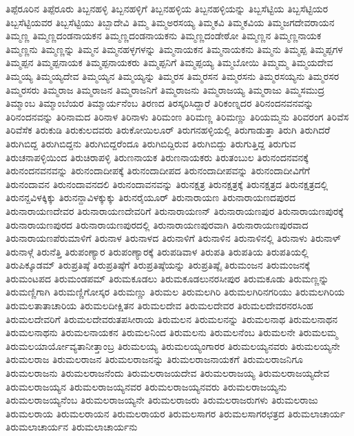 {ತಿಪ್ಪೆರೂರಿನ
ತಿಪ್ಪೆರೂರು
ತಿಬ್ಬನಹಳ್ಳಿ
ತಿಬ್ಬನಹಳ್ಳಿಗೆ
ತಿಬ್ಬನಹಳ್ಳಿಯ
ತಿಬ್ಬನಹಳ್ಳಿಯನ್ನು
ತಿಬ್ಬಸೆಟ್ಟಿಯ
ತಿಬ್ಬಸೆಟ್ಟಿಯರ
ತಿಬ್ಬಸೆಟ್ಟಿಯವರ
ತಿಬ್ಬಸೆಟ್ಟಿಯು
ತಿಬ್ಬಾದೇವಿ
ತಿಮ್ಮ
ತಿಮ್ಮಅರಸಯ್ಯ
ತಿಮ್ಮಕವಿ
ತಿಮ್ಮಕವಿಯ
ತಿಮ್ಮಜಗದೇವರಾಯನ
ತಿಮ್ಮಣ್ಣ
ತಿಮ್ಮಣ್ಣದಂಡನಾಯಕನ
ತಿಮ್ಮಣ್ಣದಂಡನಾಯಕನು
ತಿಮ್ಮಣ್ಣದಂಡೇಠೋ
ತಿಮ್ಮಣ್ಣನ
ತಿಮ್ಮಣ್ಣನಾಯಕ
ತಿಮ್ಮಣ್ಣನು
ತಿಮ್ಮಣ್ಣನ್ನು
ತಿಮ್ಮನ
ತಿಮ್ಮನಹಳ್ಳಗಳನ್ನು
ತಿಮ್ಮನಾಯಕನ
ತಿಮ್ಮನಾಯಕನು
ತಿಮ್ಮನು
ತಿಮ್ಮಪ್ಪ
ತಿಮ್ಮಪ್ಪಗಳ
ತಿಮ್ಮಪ್ಪನ
ತಿಮ್ಮಪ್ಪನಾಯಕ
ತಿಮ್ಮಪ್ಪನಾಯಕರು
ತಿಮ್ಮಪ್ಪನಿಗೆ
ತಿಮ್ಮಪ್ಪಯ್ಯ
ತಿಮ್ಮಬೋಯಿ
ತಿಮ್ಮಮ್ಮ
ತಿಮ್ಮಯದೇವ
ತಿಮ್ಮಯ್ಯ
ತಿಮ್ಮಯ್ಯದೇವ
ತಿಮ್ಮಯ್ಯನ
ತಿಮ್ಮಯ್ಯನ್ನು
ತಿಮ್ಮರಸ
ತಿಮ್ಮರಸನ
ತಿಮ್ಮರಸನು
ತಿಮ್ಮರಸಯ್ಯನು
ತಿಮ್ಮರಸರ
ತಿಮ್ಮರಸರು
ತಿಮ್ಮರಾಜ
ತಿಮ್ಮರಾಜನ
ತಿಮ್ಮರಾಜನಿಗೆ
ತಿಮ್ಮರಾಜನು
ತಿಮ್ಮರಾಜಯ್ಯ
ತಿಮ್ಮರಾಜು
ತಿಮ್ಮಸಮುದ್ರ
ತಿಮ್ಮಾಂಬ
ತಿಮ್ಮಾಂಬೆಯರ
ತಿಮ್ಮಾರ್ಯನೆಂಬ
ತಿರಣದ
ತಿರಸ್ಕರಿಸಿದ್ದಾರೆ
ತಿರಿಕಂಣ್ನದರ
ತಿರಿನಂದನವನವನ್ನು
ತಿರಿನಂದನವನ್ನು
ತಿರಿನಾಮದ
ತಿರಿನಾಳ
ತಿರಿನಾಳು
ತಿರಿಮಂಣ
ತಿರಿಮಣ್ಣ
ತಿರಿಮಣ್ಣು
ತಿರಿಯಮ್ಮನು
ತಿರಿವರಂಗ
ತಿರಿವೆಸ
ತಿರಿವೆಸೆಕ
ತಿರುಕುಡಿ
ತಿರುಕುಲದವರು
ತಿರುಕೋಯಿಲೂರ್
ತಿರುಗನಹಳ್ಳಿಯಲ್ಲಿ
ತಿರುಗಾಡುತ್ತಾ
ತಿರುಗಿ
ತಿರುಗಿದರೆ
ತಿರುಗಿಬಿದ್ದ
ತಿರುಗಿಬಿದ್ದನು
ತಿರುಗಿಬಿದ್ದರೆಂದೂ
ತಿರುಗಿಬಿದ್ದಿರುವ
ತಿರುಗಿಬಿದ್ದು
ತಿರುಗುತ್ತಿದ್ದ
ತಿರುಗುವ
ತಿರುಚನಾಪಳ್ಳಿಯಿಂದ
ತಿರುಚಿರಾಪಳ್ಳಿ
ತಿರುಣನಾಯಕ
ತಿರುಣನಾಯಕರು
ತಿರುತಂಬುಲ
ತಿರುನಂದನವನಕ್ಕೆ
ತಿರುನಂದನವನವನ್ನು
ತಿರುನಂದಾದೀಪಕ್ಕೆ
ತಿರುನಂದಾದೀಪದ
ತಿರುನಂದಾದೀಪವನ್ನು
ತಿರುನಂದಾದೀವಿಗೆಗೆ
ತಿರುನಂದಾವನ
ತಿರುನಂದಾವನದಲಿ
ತಿರುನಂದಾವನವನ್ನು
ತಿರುನಕ್ಷತ್ರ
ತಿರುನಕ್ಷತ್ರಕ್ಕೆ
ತಿರುನಕ್ಷತ್ರದ
ತಿರುನಕ್ಷತ್ರದಲ್ಲಿ
ತಿರುನನ್ದವಿಳಕ್ಕಿಕ್ಕು
ತಿರುನನ್ದಾವಿಳಕ್ಕುಕ್ಕು
ತಿರುನರೈಯೂರ್
ತಿರುನಾರಾಯಣ
ತಿರುನಾರಾಯಣದಪುರದ
ತಿರುನಾರಾಯಣದೇವರ
ತಿರುನಾರಾಯಣದೇವರಿಗೆ
ತಿರುನಾರಾಯಣನ್
ತಿರುನಾರಾಯಣಪುರ
ತಿರುನಾರಾಯಣಪುರಕ್ಕೆ
ತಿರುನಾರಾಯಣಪುರದ
ತಿರುನಾರಾಯಣಪುರದಲ್ಲಿ
ತಿರುನಾರಾಯಣಪುರವಾಗಿ
ತಿರುನಾರಾಯಣಪುರವಾದ
ತಿರುನಾರಾಯಣಪೆರುಮಾಳಿಗೆ
ತಿರುನಾಳ
ತಿರುನಾಳದ
ತಿರುನಾಳಿಗೆ
ತಿರುನಾಳಿನ
ತಿರುನಾಳಿನಲ್ಲಿ
ತಿರುನಾಳು
ತಿರುನಾಳ್
ತಿರುನಾಳ್ಗೆ
ತಿರುನೆತ್ತಿ
ತಿರುಪಂಣ್ಯಾರ
ತಿರುಪಂಣ್ಯಾರಕ್ಕೆ
ತಿರುಪಡಿವಾಳ
ತಿರುಪತಿ
ತಿರುಪತಿಯ
ತಿರುಪತಿಯಲ್ಲಿ
ತಿರುಪಿಕ್ಕೂಡಮ್
ತಿರುಪ್ರತಿಷ್ಠೆ
ತಿರುಪ್ರತಿಷ್ಠೆಗೆ
ತಿರುಪ್ರತಿಷ್ಠೆಯನ್ನು
ತಿರುಪ್ರತಿಷ್ಠೈ
ತಿರುಮಂಜನ
ತಿರುಮಂಜನಕ್ಕೆ
ತಿರುಮಂಟಪದ
ತಿರುಮಂಡಪಮ್
ತಿರುಮಕೂಡಲು
ತಿರುಮಕೂಡಲುನರಸೀಪುರ
ತಿರುಮಕೂಡು
ತಿರುಮಣ್ಣನ್ನು
ತಿರುಮಣ್ಣಿಗಾಗಿ
ತಿರುಮಣ್ಣಿಗೋಸ್ಕರ
ತಿರುಮಣ್ಣು
ತಿರುಮಲ
ತಿರುಮಲಗಿರಿ
ತಿರುಮಲಗಿರಿನಗರಿಯು
ತಿರುಮಲಗಿರಿಯ
ತಿರುಮಲತಾತಾಚಾರಿಯ
ತಿರುಮಲದೀಕ್ಷಿತನ
ತಿರುಮಲದೇವ
ತಿರುಮಲದೇವರ
ತಿರುಮಲದೇವರನರಸಿಂಹ
ತಿರುಮಲದೇವರಿಗೆ
ತಿರುಮಲದೇವರುತಪಸೀರಾಯ
ತಿರುಮಲನ
ತಿರುಮಲನನ್ನು
ತಿರುಮಲನಾಥ
ತಿರುಮಲನಾಥನ
ತಿರುಮಲನಾಥನು
ತಿರುಮಲನಾಯಕನ
ತಿರುಮಲನಿಂದ
ತಿರುಮಲನು
ತಿರುಮಲನೆಂಬ
ತಿರುಮಲನೇ
ತಿರುಮಲಮ್ಮ
ತಿರುಮಲಯಾರ್ಯೋವ್ಯತಾನೀತ್ತಾಂಬ್ರ
ತಿರುಮಲಯ್ಯ
ತಿರುಮಲಯ್ಯಂಗಾರರ
ತಿರುಮಲಯ್ಯನವರು
ತಿರುಮಲಯ್ಯನೇ
ತಿರುಮಲರಾಜ
ತಿರುಮಲರಾಜನ
ತಿರುಮಲರಾಜನನ್ನು
ತಿರುಮಲರಾಜನಾಯಕಗೆ
ತಿರುಮಲರಾಜನಿಗೂ
ತಿರುಮಲರಾಜನು
ತಿರುಮಲರಾಜನೆಂದು
ತಿರುಮಲರಾಜಯದೇವ
ತಿರುಮಲರಾಜಯ್ಯ
ತಿರುಮಲರಾಜಯ್ಯದೇವ
ತಿರುಮಲರಾಜಯ್ಯನ
ತಿರುಮಲರಾಜಯ್ಯನವರ
ತಿರುಮಲರಾಜಯ್ಯನವರು
ತಿರುಮಲರಾಜಯ್ಯನು
ತಿರುಮಲರಾಜಯ್ಯನೆಂಬ
ತಿರುಮಲರಾಜಯ್ಯನೇ
ತಿರುಮಲರಾಜರು
ತಿರುಮಲರಾಜರುಗಳು
ತಿರುಮಲರಾಜು
ತಿರುಮಲರಾಯ
ತಿರುಮಲರಾಯನ
ತಿರುಮಲರಾಯರ
ತಿರುಮಲಸಾಗರ
ತಿರುಮಲಸಾಗರಛತ್ರದ
ತಿರುಮಲಾಚಾರ್ಯ
ತಿರುಮಲಾಚಾರ್ಯನ
ತಿರುಮಲಾಚಾರ್ಯನು
}
